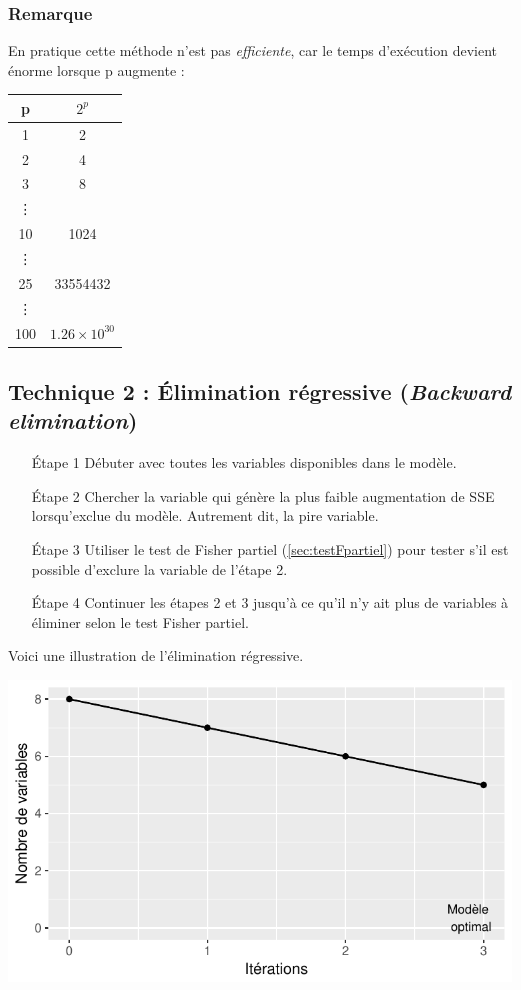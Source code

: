 \documentclass[11pt,french]{report}
\begin{document}
\subsubsection*{Remarque}
En pratique cette méthode n'est pas \emph{efficiente}, car le temps d'exécution devient énorme lorsque p augmente :

\begin{center}
\begin{tabular}{|c|c|}
\hline
p & $2^p$ \\
\hline
1 & 2 \\
2 & 4 \\
3 & 8 \\
\vdots & \\
10 & 1024 \\
\vdots & \\
25 & 33554432 \\
\vdots & \\
100 & $1.26\times 10^{30}$ \\
\hline
\end{tabular}
\end{center}

\subsection{Technique 2 : Élimination régressive (\emph{Backward elimination})}
\label{tech2}

\begin{itemize}
\item [Étape 1] Débuter avec toutes les variables disponibles dans le modèle.

\item [Étape 2] Chercher la variable qui génère la plus faible augmentation de SSE lorsqu'exclue du modèle. Autrement dit, la pire variable.

\item [Étape 3] Utiliser le test de Fisher partiel (\ref{sec:testFpartiel}) pour tester s'il est possible d'exclure la variable de l'étape 2.

\item [Étape 4] Continuer les étapes 2 et 3 jusqu'à ce qu'il n'y ait plus de variables à éliminer selon le test Fisher partiel.
\end{itemize}
\bigskip

Voici une illustration de l'élimination régressive.

\includegraphics{notes_de_cours-025}
\end{document}
